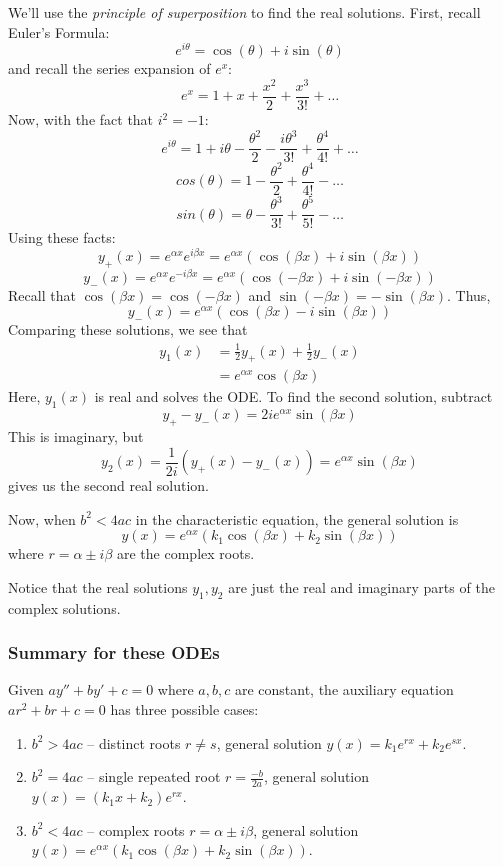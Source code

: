 \documentclass[11pt]{article}
\begin{document}
	We'll use the \emph{principle of superposition} to find the real solutions. First, recall Euler's Formula:
		$$ e^{i\theta} = \cos(\theta) + i \sin(\theta) $$
	and recall the series expansion of $e^x$:
		$$ e^x = 1 + x + \frac{x^2}{2} + \frac{x^3}{3!} + \ldots $$
	Now, with the fact that $i^2 = -1$:
		$$ e^{i \theta} = 1 + i \theta - \frac{\theta^2}{2} - \frac{i\theta^3}{3!} + \frac{\theta^4}{4!} + \ldots $$
		$$ cos(\theta) = 1 - \frac{\theta^2}{2} + \frac{\theta^4}{4!} - \ldots $$
		$$ sin(\theta) = \theta - \frac{\theta^3}{3!} + \frac{\theta^5}{5!} - \ldots $$
	Using these facts:
		$$ y_{+}(x) = e^{\alpha x} e^{i \beta x} = e^{\alpha x}(\cos(\beta x) + i \sin(\beta x)) $$
		$$ y_{-}(x) = e^{\alpha x} e^{-i\beta x} = e^{\alpha x}(\cos(-\beta x) + i \sin(- \beta x)) $$
	Recall that $\cos(\beta x) = \cos(- \beta x)$ and $\sin(-\beta x) = - \sin(\beta x)$. Thus,
		$$ y_{-}(x) = e^{\alpha x} (\cos(\beta x) - i \sin(\beta x)) $$
	Comparing these solutions, we see that
		\begin{align*}
			y_1 (x) &= \frac{1}{2} y_{+} (x) + \frac{1}{2} y_{-} (x) \\
				&= e^{\alpha x} \cos(\beta x)
		\end{align*}
	Here, $y_1(x)$ is real and solves the ODE. To find the second solution, subtract
		$$ y_{+} - y_{-}(x) = 2ie^{\alpha x} \sin(\beta x) $$
	This is imaginary, but
		$$ y_2 (x) = \frac{1}{2i} (y_{+} (x) - y_{-}(x)) = e^{\alpha x} \sin(\beta x) $$
	gives us the second real solution.

	Now, when $b^2 < 4ac$ in the characteristic equation, the general solution is
		$$ y(x) = e^{\alpha x} (k_1 \cos(\beta x) + k_2 \sin(\beta x)) $$
	where $r = \alpha \pm i \beta$ are the complex roots.

	Notice that the real solutions $y_1, y_2$ are just the real and imaginary parts of the complex solutions.

\subsubsection{Summary for these ODEs}
	Given $a y'' + b y' + c = 0$ where $a,b,c$ are constant, the auxiliary equation $ar^2 + br + c = 0$ has three possible cases:
		\begin{enumerate}
			\item $b^2 > 4ac$ -- distinct roots $r \neq s$, general solution $y(x) = k_1 e^{rx} + k_2 e^{s x}$.
			\item $b^2 = 4ac$ -- single repeated root $r = \frac{-b}{2a}$, general solution $y(x) = (k_1 x + k_2) e^{rx}$.
			\item $b^2 < 4ac$ -- complex roots $r = \alpha \pm i \beta$, general solution $y(x) = e^{\alpha x} (k_1 \cos(\beta x) + k_2 \sin (\beta x))$.
		\end{enumerate}
\end{document}
